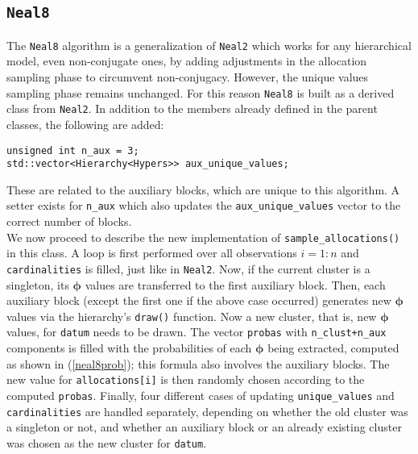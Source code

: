 \subsection{\texttt{Neal8}}
The \verb|Neal8| algorithm is a generalization of \verb|Neal2| which works for any hierarchical model, even non-conjugate ones, by adding adjustments in the allocation sampling phase to circumvent non-conjugacy.
However, the unique values sampling phase remains unchanged.
For this reason \verb|Neal8| is built as a derived class from \verb|Neal2|.
In addition to the members already defined in the parent classes, the following are added:
\begin{verbatim}
unsigned int n_aux = 3;
std::vector<Hierarchy<Hypers>> aux_unique_values;
\end{verbatim}
These are related to the auxiliary blocks, which are unique to this algorithm.
A setter exists for \verb|n_aux| which also updates the \verb|aux_unique_values| vector to the correct number of blocks. \\
We now proceed to describe the new implementation of \verb|sample_allocations()| in this class.
A loop is first performed over all observations $i=1:n$ and \verb|cardinalities| is filled, just like in \verb|Neal2|.
Now, if the current cluster is a singleton, its $\boldsymbol\phi$ values are transferred to the first auxiliary block.
Then, each auxiliary block (except the first one if the above case occurred) generates new $\boldsymbol\phi$ values via the hierarchy's \verb|draw()| function.
Now a new cluster, that is, new $\boldsymbol\phi$ values, for \verb|datum| needs to be drawn.
The vector \verb|probas| with \verb|n_clust+n_aux| components is filled with the probabilities of each $\boldsymbol\phi$ being extracted, computed as shown in (\ref{neal8prob}); this formula also involves the auxiliary blocks.
The new value for \verb|allocations[i]| is then randomly chosen according to the computed \verb|probas|.
Finally, four different cases of updating \verb|unique_values| and \verb|cardinalities| are handled separately, depending on whether the old cluster was a singleton or not, and whether an auxiliary block or an already existing cluster was chosen as the new cluster for \verb|datum|.


